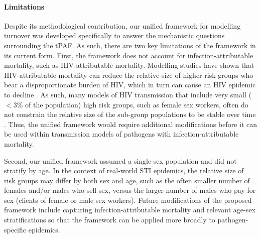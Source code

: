 \paragraph{Limitations}
Despite its methodological contribution, our unified 
framework for modelling turnover was developed specifically 
to answer the mechanistic questions surrounding the tPAF. 
As such, there are two key limitations of the framework in its current form.
First, the framework does not account for						%
infection-attributable mortality, such as HIV-attributable mortality.
Modelling studies have shown that HIV-attributable mortality can reduce the 
relative size of higher risk groups who bear a disproportionate burden of HIV, which in turn 
can cause an HIV epidemic to decline \citep{Boily1997}.
As such, many models of HIV transmission
that include very small ($<3\%$ of the population)
high risk groups, such as female sex workers,
often do not constrain the relative size
of the sub-group populations to be stable over time
\citep{Pickles2013}. Thus, the unified framework would require 
additional modifications before it can be used within transmission models of 
pathogens with infection-attributable mortality.									



Second, our unified framework assumed a single-sex population and did not stratify by age.		%
In the context of real-world STI epidemics,
the relative size of risk groups may differ
by both sex and age,
such as the often smaller number of females and/or males who sell sex,
versus the larger number of males who pay for sex (clients of female or male sex workers).
Future modifications of the proposed framework include capturing
infection-attributable mortality and relevant age-sex stratifications so that
the framework can be applied more broadly to pathogen-specific epidemics.

